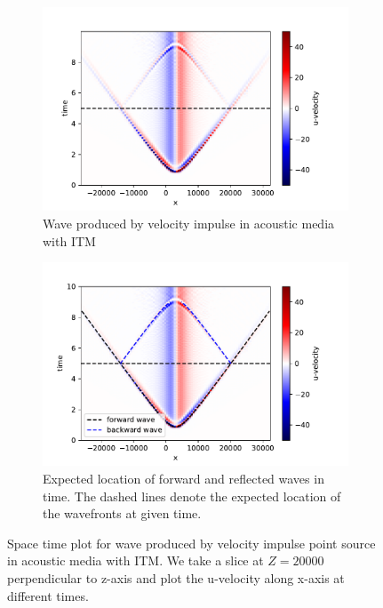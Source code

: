\begin{figure}
\begin{subfigure}[t]{0.49\textwidth}   
    \centering 
    \includegraphics[width=\textwidth]{figures/AcousticITM.pdf}
    \caption{Wave produced by velocity impulse in acoustic media with \ac{ITM}}
\end{subfigure}
\hfill
\begin{subfigure}[t]{0.49\textwidth}   
    \centering 
    \includegraphics[width=\textwidth]{figures/AcousticITMAnnotated.pdf}
    \caption{Expected location of forward and reflected waves in time. The dashed lines denote the expected location of the wavefronts at given time.}
    \label{subfig:acousticITMAnnotated}
\end{subfigure}
\caption{Space time plot for wave produced by velocity impulse point source in acoustic media with \ac{ITM}. We take a slice at $Z=20000$ perpendicular to z-axis
and plot the u-velocity along x-axis at different times.}
\label{fig:space-timeplot-acousticITM}
\end{figure}

